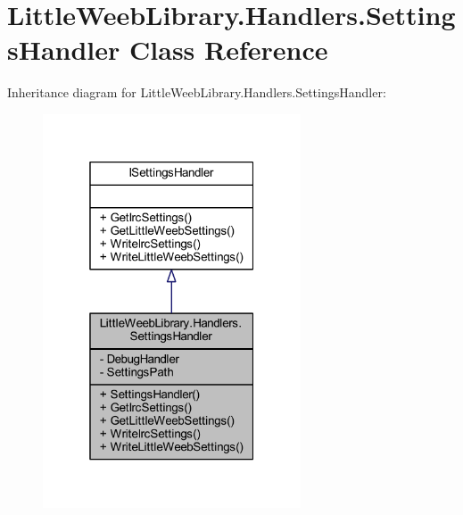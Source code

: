 \hypertarget{class_little_weeb_library_1_1_handlers_1_1_settings_handler}{}\section{Little\+Weeb\+Library.\+Handlers.\+Settings\+Handler Class Reference}
\label{class_little_weeb_library_1_1_handlers_1_1_settings_handler}


Inheritance diagram for Little\+Weeb\+Library.\+Handlers.\+Settings\+Handler\+:\nopagebreak
\begin{figure}[H]
\begin{center}
\leavevmode
\includegraphics[width=217pt]{class_little_weeb_library_1_1_handlers_1_1_settings_handler__inherit__graph}
\end{center}
\end{figure}



